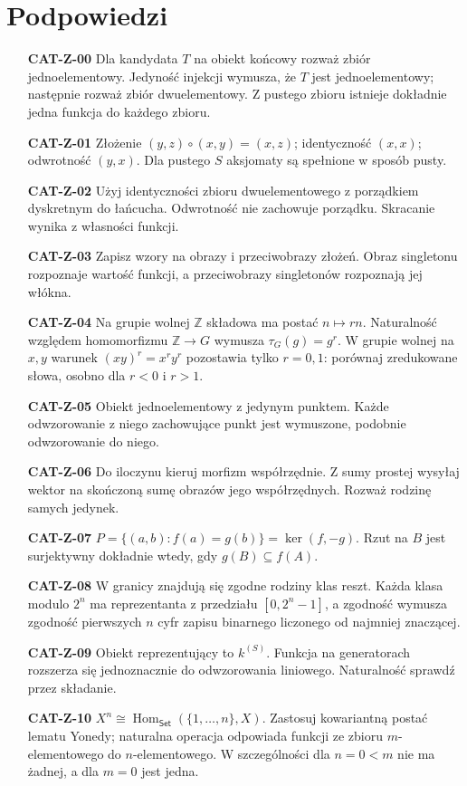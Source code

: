 \documentclass[11pt,a4paper]{article}
\newcommand{\Hom}{\operatorname{Hom}}
\newcommand{\Set}{\mathsf{Set}}
\begin{document}
\section{Podpowiedzi}
\begin{enumerate}
\item[\textbf{CAT-Z-00}] Dla kandydata $T$ na obiekt końcowy rozważ zbiór jednoelementowy. Jedyność injekcji wymusza, że $T$ jest jednoelementowy; następnie rozważ zbiór dwuelementowy. Z pustego zbioru istnieje dokładnie jedna funkcja do każdego zbioru.
\item[\textbf{CAT-Z-01}] Złożenie $(y,z)\circ(x,y)=(x,z)$; identyczność $(x,x)$; odwrotność $(y,x)$. Dla pustego $S$ aksjomaty są spełnione w sposób pusty.
\item[\textbf{CAT-Z-02}] Użyj identyczności zbioru dwuelementowego z porządkiem dyskretnym do łańcucha. Odwrotność nie zachowuje porządku. Skracanie wynika z własności funkcji.
\item[\textbf{CAT-Z-03}] Zapisz wzory na obrazy i przeciwobrazy złożeń. Obraz singletonu rozpoznaje wartość funkcji, a przeciwobrazy singletonów rozpoznają jej włókna.
\item[\textbf{CAT-Z-04}] Na grupie wolnej $\mathbb Z$ składowa ma postać $n\mapsto rn$. Naturalność względem homomorfizmu $\mathbb Z\to G$ wymusza $\tau_G(g)=g^r$. W grupie wolnej na $x,y$ warunek $(xy)^r=x^ry^r$ pozostawia tylko $r=0,1$: porównaj zredukowane słowa, osobno dla $r<0$ i $r>1$.
\item[\textbf{CAT-Z-05}] Obiekt jednoelementowy z jedynym punktem. Każde odwzorowanie z niego zachowujące punkt jest wymuszone, podobnie odwzorowanie do niego.
\item[\textbf{CAT-Z-06}] Do iloczynu kieruj morfizm współrzędnie. Z sumy prostej wysyłaj wektor na skończoną sumę obrazów jego współrzędnych. Rozważ rodzinę samych jedynek.
\item[\textbf{CAT-Z-07}] $P=\{(a,b):f(a)=g(b)\}=\ker(f,-g)$. Rzut na $B$ jest surjektywny dokładnie wtedy, gdy $g(B)\subseteq f(A)$.
\item[\textbf{CAT-Z-08}] W granicy znajdują się zgodne rodziny klas reszt. Każda klasa modulo $2^n$ ma reprezentanta z przedziału $[0,2^n-1]$, a zgodność wymusza zgodność pierwszych $n$ cyfr zapisu binarnego liczonego od najmniej znaczącej.
\item[\textbf{CAT-Z-09}] Obiekt reprezentujący to $k^{(S)}$. Funkcja na generatorach rozszerza się jednoznacznie do odwzorowania liniowego. Naturalność sprawdź przez składanie.
\item[\textbf{CAT-Z-10}] $X^n\cong\Hom_{\Set}(\{1,\ldots,n\},X)$. Zastosuj kowariantną postać lematu Yonedy; naturalna operacja odpowiada funkcji ze zbioru $m$-elementowego do $n$-elementowego. W szczególności dla $n=0<m$ nie ma żadnej, a dla $m=0$ jest jedna.

\end{enumerate}
\end{document}

